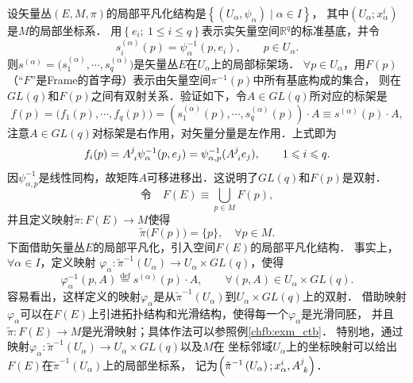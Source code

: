 设矢量丛$(E,M,\pi)$的局部平凡化结构是$\left\{\left(U_{\alpha}, \psi_{\alpha}\right) \mid  \alpha \in I\right\}$，
其中$\left(U_{\alpha} ; x_{\alpha}^{i}\right)$是$M$的局部坐标系．
用$\left\{e_{i} ;\ 1 \leqslant i \leqslant q\right\}$表示实矢量空间$\mathbb{R}^{q}$的标准基底，并令 
\begin{equation}
    s_{i}^{(\alpha)}(p)=\psi_{\alpha}^{-1}\left(p, e_{i}\right), \qquad p \in U_{\alpha} .
\end{equation}
则$s^{(\alpha)}=\bigl(s_{1}^{(\alpha)}, \cdots, s_{q}^{(\alpha)}\bigr)$是矢量丛$E$在$U_{\alpha}$上的局部标架场．
$\forall p \in U_{\alpha}$，用$F(p)$（“$F$”是Frame的首字母）表示由矢量空间$\pi^{-1}(p)$中所有基底构成的集合，
则在$GL(q)$和$F(p)$之间有双射关系．验证如下，令$A \in GL(q)$所对应的标架是 
\begin{equation}\label{chfb:eqn_F-comp}
    f(p)  =\bigl(f_{1}(p), \cdots, f_{q}(p)\bigr) 
    =\left(s_{1}^{(\alpha)}(p), \cdots, s_{q}^{(\alpha)}(p)\right) \cdot A \equiv s^{(\alpha)}(p) \cdot A, 
\end{equation}
注意$A \in GL(q)$对标架是右作用，对矢量分量是左作用．上式即为 
\begin{equation}\label{chfb:eqn_F-comp-expand}
    f_{i}(p)=A_{\hphantom{i}i}^{j} \psi_{\alpha}^{-1}(p, e_{j})
    =\psi_{\alpha, p}^{-1} (A_{\hphantom{i}i}^{j} e_{j}), \qquad 1 \leqslant i \leqslant q .
\end{equation}
因$\psi_{\alpha, p}^{-1}$是线性同构，故矩阵$A$可移进移出．这说明了$GL(q)$和$F(p)$是双射．
\begin{equation}\label{chfb:eqn_FE}
    \text{令}\quad  F(E)\equiv \bigcup_{p \in M} F(p) ,
\end{equation}
并且定义映射$\tilde{\pi}: F(E) \rightarrow M$使得
\begin{equation}\label{chfb:eqn_FE-pi}
    \tilde{\pi}\bigl(F(p)\bigr)=\{p\} , \quad \forall p \in M.
\end{equation}
下面借助矢量丛$E$的局部平凡化，引入空间$F(E)$的局部平凡化结构．
事实上，$\forall \alpha \in I$，定义映射
$\varphi_{\alpha}: \tilde{\pi}^{-1}(U_{\alpha})\to U_{\alpha} \times GL(q) $，使得 
\begin{equation}\label{chfb:eqn_FE-phi}
    \varphi_{\alpha}^{-1}(p, A) \overset{\mathrm {def}}{=} s^{(\alpha)}(p)
     \cdot A, \qquad \forall(p, A) \in U_{\alpha} \times GL(q) .
\end{equation}
容易看出，这样定义的映射$\varphi_{\alpha}$是从$\tilde{\pi}^{-1}\left(U_{\alpha}\right)$到$U_{\alpha} \times GL(q)$上的双射．
借助映射$\varphi_{\alpha}$可以在$F(E)$上引进拓扑结构和光滑结构，使得每一个$\varphi_{\alpha}$是光滑同胚，
并且$\tilde{\pi}: F(E) \rightarrow M$是光滑映射；具体作法可以参照例\ref{chfb:exm_ctb}．  
特别地，通过映射$\varphi_{\alpha}: \tilde{\pi}^{-1}(U_{\alpha}) \rightarrow U_{\alpha} \times GL(q)$以及$M$在
坐标邻域$U_{\alpha}$上的坐标映射可以给出$F(E)$在$\tilde{\pi}^{-1}(U_{\alpha})$上的局部坐标系，
记为$\left(\tilde{\pi}^{-1}\left(U_{\alpha}\right) ; x_{\alpha}^{i}, A_{\hphantom{i}k}^{j} \right)$．

